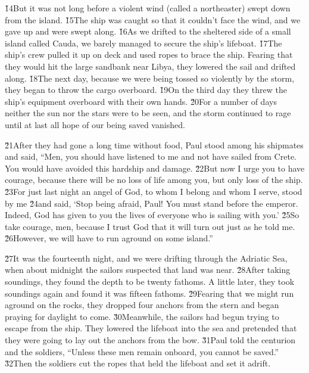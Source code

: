 \v{14}But it was not long before a violent wind (called a northeaster) swept down from the island. \v{15}The ship was caught so that it couldn't face the wind, and we gave up and were swept along. \v{16}As we drifted to the sheltered side of a small island called Cauda, we barely managed to secure the ship's lifeboat. \v{17}The ship's crew pulled it up on deck and used ropes to brace the ship. Fearing that they would hit the large sandbank near Libya, they lowered the sail and drifted along. \v{18}The next day, because we were being tossed so violently by the storm, they began to throw the cargo overboard. \v{19}On the third day they threw the ship's equipment overboard with their own hands. \v{20}For a number of days neither the sun nor the stars were to be seen, and the storm continued to rage until at last all hope of our being saved vanished.

\v{21}After they had gone a long time without food, Paul stood among his shipmates and said, ``Men, you should have listened to me and not have sailed from Crete. You would have avoided this hardship and damage. \v{22}But now I urge you to have courage, because there will be no loss of life among you, but only loss of the ship. \v{23}For just last night an angel of God, to whom I belong and whom I serve, stood by me \v{24}and said, `Stop being afraid, Paul! You must stand before the emperor. Indeed, God has given to you the lives of everyone who is sailing with you.' \v{25}So take courage, men, because I trust God that it will turn out just as he told me. \v{26}However, we will have to run aground on some island.''

\v{27}It was the fourteenth night, and we were drifting through the Adriatic Sea, when about midnight the sailors suspected that land was near. \v{28}After taking soundings, they found the depth to be twenty fathoms. A little later, they took soundings again and found it was fifteen fathoms. \v{29}Fearing that we might run aground on the rocks, they dropped four anchors from the stern and began praying for daylight to come. \v{30}Meanwhile, the sailors had begun trying to escape from the ship. They lowered the lifeboat into the sea and pretended that they were going to lay out the anchors from the bow. \v{31}Paul told the centurion and the soldiers, ``Unless these men remain onboard, you cannot be saved.'' \v{32}Then the soldiers cut the ropes that held the lifeboat and set it adrift.


